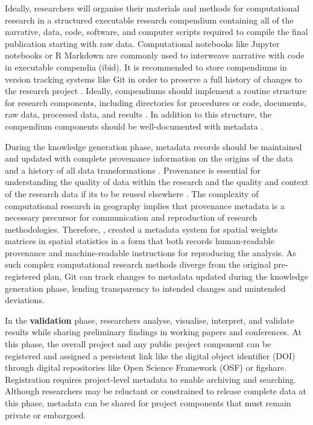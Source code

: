 \documentclass{isprs} %
\begin{document}
Ideally, researchers will organise their materials and methods for computational research in a structured executable research compendium \citep{Singleton2016,Nust2021} containing all of the narrative, data, code, software, and computer scripts required to compile the final publication starting with raw data.
Computational notebooks like Jupyter notebooks or R Markdown are commonly used to interweave narrative with code in executable compendia (ibid).
It is recommended to store compendiums in version tracking systems like Git in order to preserve a full history of changes to the research project \citep{Stodden2014}.
Ideally, compendiums should implement a routine structure for research components, including directories for procedures or code, documents, raw data, processed data, and results \cite{Kedron_Holler_2022,Christensen2019,Marwick2018}. In addition to this structure, the compendium components should be well-documented with metadata \cite{Kedron_Holler_2022,Marwick2018}.


During the knowledge generation phase, metadata records should be maintained and updated with complete provenance information on the origins of the data and a history of all data transformations \citep{NASEM2019,Tullis2021}.
Provenance is essential for understanding the quality of data within the research and the quality and context of the research data if its to be reused elsewhere \citep{Tullis2021,Schuurman2006}.
The complexity of computational research in geography implies that provenance metadata is a necessary precursor for communication and reproduction of research methodologies.
Therefore, \citet{Anselin2014}, created a metadata system for spatial weights matrices in spatial statistics in a form that both records human-readable provenance and machine-readable instructions for reproducing the analysis.
As such complex computational research methods diverge from the original pre-registered plan, Git can track changes to metadata updated during the knowledge generation phase, lending transparency to intended changes and unintended deviations.

In the \textbf{validation} phase, researchers analyse, visualise, interpret, and validate results while sharing preliminary findings in working papers and conferences.
At this phase, the overall project and any public project component can be registered and assigned a persistent link like the digital object identifier (DOI) through digital repositories like Open Science Framework (OSF) or figshare.
Registration requires project-level metadata to enable archiving and searching.
Although researchers may be reluctant or constrained to release complete data at this phase, metadata can be shared for project components that must remain private or embargoed.
\end{document}
